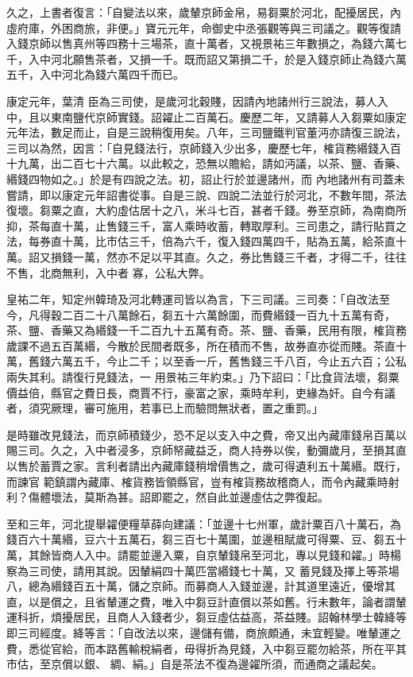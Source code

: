 \begin{pinyinscope}
 久之，上書者復言：「自變法以來，歲輦京師金帛，易芻粟於河北，配擾居民，內虛府庫，外困商旅，非便。」寶元元年，命御史中丞張觀等與三司議之。觀等復請入錢京師以售真州等四務十三場茶，直十萬者，又視景祐三年數損之，為錢六萬七千，入中河北願售茶者，又損一千。既而詔又第損二千，於是入錢京師止為錢六萬五千，入中河北為錢六萬四千而已。



 康定元年，葉清
 臣為三司使，是歲河北穀賤，因請內地諸州行三說法，募人入中，且以東南鹽代京師實錢。詔糴止二百萬石。慶歷二年，又請募人入芻粟如康定元年法，數足而止，自是三說稍復用矣。八年，三司鹽鐵判官董沔亦請復三說法，三司以為然，因言：「自見錢法行，京師錢入少出多，慶歷七年，榷貨務緡錢入百十九萬，出二百七十六萬。以此較之，恐無以贍給，請如沔議，以茶、鹽、香藥、緡錢四物如之。」於是有四說之法。初，詔止行於並邊諸州，而
 內地諸州有司蓋未嘗請，即以康定元年詔書從事。自是三說、四說二法並行於河北，不數年間，茶法復壞。芻粟之直，大約虛估居十之八，米斗七百，甚者千錢。券至京師，為南商所抑，茶每直十萬，止售錢三千，富人乘時收蓄，轉取厚利。三司患之，請行貼買之法，每券直十萬，比市估三千，倍為六千，復入錢四萬四千，貼為五萬，給茶直十萬。詔又損錢一萬，然亦不足以平其直。久之，券比售錢三千者，才得二千，往往不售，北商無利，入中者
 寡，公私大弊。



 皇祐二年，知定州韓琦及河北轉運司皆以為言，下三司議。三司奏：「自改法至今，凡得穀二百二十八萬餘石，芻五十六萬餘圍，而費緡錢一百九十五萬有奇，茶、鹽、香藥又為緡錢一千二百九十五萬有奇。茶、鹽、香藥，民用有限，榷貨務歲課不過五百萬緡，今散於民間者既多，所在積而不售，故券直亦從而賤。茶直十萬，舊錢六萬五千，今止二千；以至香一斤，舊售錢三千八百，今止五六百；公私兩失其利。請復行見錢法，一
 用景祐三年約束。」乃下詔曰：「比食貨法壞，芻粟價益倍，縣官之費日長，商賈不行，豪富之家，乘時牟利，吏緣為奸。自今有議者，須究厥理，審可施用，若事已上而驗問無狀者，置之重罰。」



 是時雖改見錢法，而京師積錢少，恐不足以支入中之費，帝又出內藏庫錢帛百萬以賜三司。久之，入中者浸多，京師帑藏益乏，商人持券以俟，動彌歲月，至損其直以售於蓄賈之家。言利者請出內藏庫錢稍增價售之，歲可得遺利五十萬緡。既行，而諫官
 範鎮謂內藏庫、榷貨務皆領縣官，豈有榷貨務故稽商人，而令內藏乘時射利？傷體壞法，莫斯為甚。詔即罷之，然自此並邊虛估之弊復起。



 至和三年，河北提舉糴便糧草薛向建議：「並邊十七州軍，歲計粟百八十萬石，為錢百六十萬緡，豆六十五萬石，芻三百七十萬圍，並邊租賦歲可得粟、豆、芻五十萬，其餘皆商人入中。請罷並邊入粟，自京輦錢帛至河北，專以見錢和糴。」時楊察為三司使，請用其說。因輦絹四十萬匹當緡錢七十萬，又
 蓄見錢及擇上等茶場八，總為緡錢百五十萬，儲之京師。而募商人入錢並邊，計其道里遠近，優增其直，以是償之，且省輦運之費，唯入中芻豆計直償以茶如舊。行未數年，論者謂輦運科折，煩擾居民，且商人入錢者少，芻豆虛估益高，茶益賤。詔翰林學士韓絳等即三司經度。絳等言：「自改法以來，邊儲有備，商旅頗通，未宜輕變。唯輦運之費，悉從官給，而本路舊輸稅絹者，毋得折為見錢，入中芻豆罷勿給茶，所在平其市估，至京償以銀、
 綢、絹。」自是茶法不復為邊糴所須，而通商之議起矣。




\end{pinyinscope}
